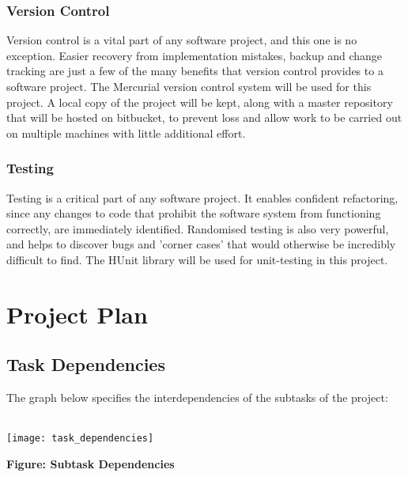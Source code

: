 \documentclass{article}
\begin{document}
\subsubsection{Version Control}
Version control is a vital part of any software project, and this one is no exception. Easier recovery from implementation mistakes, backup and change tracking are just a few of the many benefits that version control provides to a software project. The Mercurial version control system will be used for this project. A local copy of the project will be kept, along with a master repository that will be hosted on bitbucket, to prevent loss and allow work to be carried out on multiple machines with little additional effort. \\

\subsubsection{Testing}
Testing is a critical part of any software project. It enables confident refactoring, since any changes to code that prohibit the software system from functioning correctly, are immediately identified. Randomised testing is also very powerful, and helps to discover bugs and 'corner cases' that would otherwise be incredibly difficult to find. The HUnit library will be used for unit-testing in this project.

\pagebreak
\section{Project Plan}
\subsection{Task Dependencies}
The graph below specifies the interdependencies of the subtasks of the project:
\\\\
\centerline{\texttt{[image: task\_dependencies]}}
\centerline{\textbf{Figure: Subtask Dependencies}}
\end{document}
